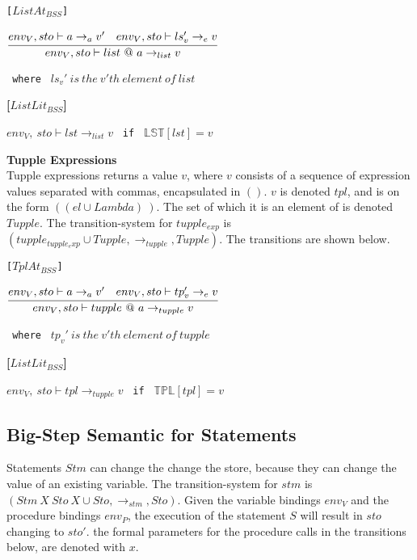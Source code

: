 {\texttt{[$ListAt_{BSS}$]}\\
\begin{center}
	\begin{math}
		\cfrac
			{env_V, sto \vdash a \rightarrow_{a} v' \quad env_V, sto \vdash ls_v' \rightarrow_e v}
			{env_V, sto \vdash list\ @\ a \rightarrow_{list} v}
	\end{math}
	
	\texttt{ where } $ls_v'\ is\ the\ v'th\ element\ of\ list$
\end{center}

\textbf{[$ListLit_{BSS}$]}\\
\begin{center}
	\begin{math}
	env_V,\ sto \vdash lst \rightarrow_{list} v
	\end{math}
	\texttt{ if } $\mathbb{LST}[lst] = v$
\end{center}

\textbf{\Large{Tupple Expressions}}\\
Tupple expressions returns a value $v$, where $v$ consists of a sequence of expression values separated with commas, encapsulated in $()$.
$v$ is denoted $tpl$, and is on the form $((el \cup Lambda)~)$.
The set of which it is an element of is denoted $Tupple$.
The transition-system for $tupple_{exp}$ is $(tupple_{tupple_exp} \cup Tupple, \rightarrow_{tupple}, Tupple)$.
The transitions are shown below.

\texttt{[$TplAt_{BSS}$]}\\
\begin{center}
	\begin{math}
	\cfrac
	{env_V, sto \vdash a \rightarrow_{a} v' \quad env_V, sto \vdash tp_v' \rightarrow_e v}
	{env_V, sto \vdash tupple\ @\ a \rightarrow_{tupple} v}
	\end{math}
	
	\texttt{ where } $tp_v'\ is\ the\ v'th\ element\ of\ tupple$
\end{center}

\textbf{[$ListLit_{BSS}$]}\\
\begin{center}
	\begin{math}
	env_V,\ sto \vdash tpl \rightarrow_{tupple} v
	\end{math}
	\texttt{ if } $\mathbb{TPL}[tpl] = v$
\end{center}

\subsection{Big-Step Semantic for Statements}
Statements $Stm$ can change the change the store, because they can change the value of an existing variable.
The transition-system for $stm$ is $(Stm\ X\ Sto\ X \cup Sto, \rightarrow_{stm}, Sto)$.
Given the variable bindings $env_V$ and the procedure bindings $env_P$, the execution of the statement $S$ will 
result in $sto$ changing to $sto'$.
the formal parameters for the procedure calls in the transitions below, are denoted with $x$.

}
